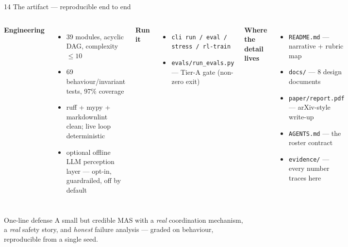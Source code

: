 \documentclass[aspectratio=169,11pt]{beamer}
\begin{document}
\begin{frame}{14 \;\; The artifact --- reproducible end to end}
  \small
  \begin{columns}[T]
    \textbf{Engineering}
    \begin{itemize}\footnotesize
      \item 39 modules, acyclic DAG, complexity $\le 10$
      \item 69 behaviour/invariant tests, 97\% coverage
      \item ruff + mypy + markdownlint clean; live loop deterministic
      \item optional offline LLM perception layer --- opt-in, guardrailed, off by default
    \end{itemize}
    \textbf{Run it}
    \begin{itemize}\footnotesize
      \item \texttt{cli run / eval / stress / rl-train}
      \item \texttt{evals/run\_evals.py} --- Tier-A gate (non-zero exit)
    \end{itemize}
    \textbf{Where the detail lives}
    \begin{itemize}\footnotesize
      \item \texttt{README.md} --- narrative + rubric map
      \item \texttt{docs/} --- 8 design documents
      \item \texttt{paper/report.pdf} --- arXiv-style write-up
      \item \texttt{AGENTS.md} --- the roster contract
      \item \texttt{evidence/} --- every number traces here
    \end{itemize}
  \end{columns}
  \vspace{0.6em}
  \begin{block}{One-line defense}
    A small but credible MAS with a \emph{real} coordination mechanism, a \emph{real} safety story,
    and \emph{honest} failure analysis --- graded on behaviour, reproducible from a single seed.
  \end{block}
\end{frame}
\end{document}
